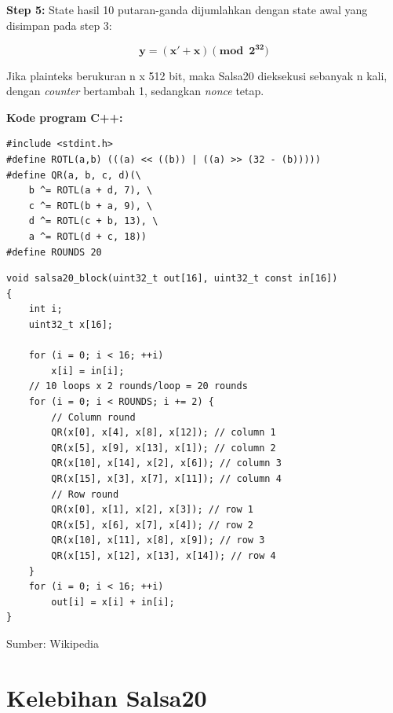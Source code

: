 \documentclass{article}
\begin{document}
\newpage


\textbf{Step 5:} State hasil 10 putaran-ganda dijumlahkan dengan state awal yang disimpan pada step 3:

\[
\mathbf{y = (x' + x) \pmod{2^{32}}}
\]

Jika plainteks berukuran n x 512 bit, maka Salsa20 dieksekusi sebanyak n kali, dengan \textit{counter} bertambah 1, sedangkan \textit{nonce} tetap.

\textbf{Kode program C++:}

\begin{verbatim}
#include <stdint.h>
#define ROTL(a,b) (((a) << ((b)) | ((a) >> (32 - (b)))))
#define QR(a, b, c, d)(\ 
    b ^= ROTL(a + d, 7), \ 
    c ^= ROTL(b + a, 9), \ 
    d ^= ROTL(c + b, 13), \ 
    a ^= ROTL(d + c, 18))
#define ROUNDS 20
\end{verbatim}

\newpage


\begin{verbatim}
void salsa20_block(uint32_t out[16], uint32_t const in[16])
{
    int i;
    uint32_t x[16];

    for (i = 0; i < 16; ++i)
        x[i] = in[i];
    // 10 loops x 2 rounds/loop = 20 rounds
    for (i = 0; i < ROUNDS; i += 2) {
        // Column round
        QR(x[0], x[4], x[8], x[12]); // column 1
        QR(x[5], x[9], x[13], x[1]); // column 2
        QR(x[10], x[14], x[2], x[6]); // column 3
        QR(x[15], x[3], x[7], x[11]); // column 4
        // Row round
        QR(x[0], x[1], x[2], x[3]); // row 1
        QR(x[5], x[6], x[7], x[4]); // row 2
        QR(x[10], x[11], x[8], x[9]); // row 3
        QR(x[15], x[12], x[13], x[14]); // row 4
    }
    for (i = 0; i < 16; ++i)
        out[i] = x[i] + in[i];
}
\end{verbatim}

\begin{flushright}
Sumber: Wikipedia
\end{flushright}

\newpage


\section*{Kelebihan Salsa20}
\end{document}
